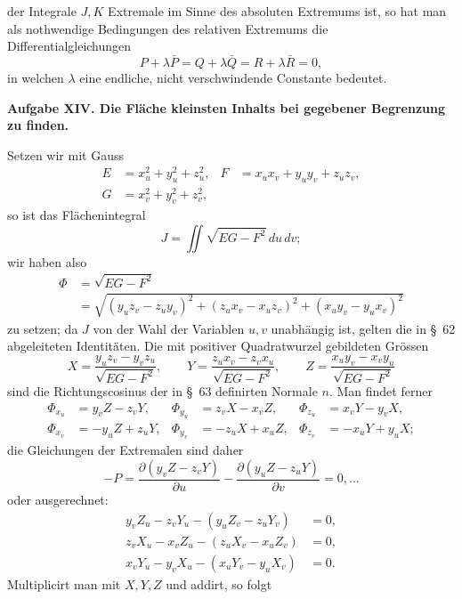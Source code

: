 \documentclass[11pt,a4paper,leqno]{article}
\begin{document}
der Integrale $J,K$ Extremale im Sinne des absoluten Extremums ist,
so hat man als nothwendige Bedingungen des relativen Extremums
die Differentialgleichungen
\[
P+\lambda\bar P=Q+\lambda\bar Q=R+\lambda\bar R=0,
\]
in welchen $\lambda$ eine endliche, nicht verschwindende Constante bedeutet.

\begin{center}
\textbf{Aufgabe XIV. Die Fläche kleinsten Inhalts bei gegebener
Begrenzung zu finden.}
\end{center}

Setzen wir mit Gauss
\[
\begin{aligned}
E&=x_u^2+y_u^2+z_u^2,
&F&=x_ux_v+y_uy_v+z_uz_v,\\
G&=x_v^2+y_v^2+z_v^2,
\end{aligned}
\]
so ist das Flächenintegral
\[
J=\iint\sqrt{EG-F^2}\,du\,dv;
\]
wir haben also
\[
\begin{aligned}
\Phi&=\sqrt{EG-F^2}\\
&=\sqrt{(y_uz_v-z_uy_v)^2+(z_ux_v-x_uz_v)^2+(x_uy_v-y_ux_v)^2}
\end{aligned}
\]
zu setzen; da $J$ von der Wahl der Variablen $u,v$ unabhängig
ist, gelten die in \S~62 abgeleiteten Identitäten. Die mit positiver
Quadratwurzel gebildeten Grössen
\[
X=\frac{y_uz_v-y_vz_u}{\sqrt{EG-F^2}},\qquad
Y=\frac{z_ux_v-z_vx_u}{\sqrt{EG-F^2}},\qquad
Z=\frac{x_uy_v-x_vy_u}{\sqrt{EG-F^2}}
\]
sind die Richtungscosinus der in \S~63 definirten Normale $n$.
Man findet ferner
\begin{equation}\tag{10}
\begin{aligned}
\Phi_{x_u}&=y_vZ-z_vY,&
\Phi_{y_u}&=z_vX-x_vZ,&
\Phi_{z_u}&=x_vY-y_vX,\\
\Phi_{x_v}&=-y_uZ+z_uY,&
\Phi_{y_v}&=-z_uX+x_uZ,&
\Phi_{z_v}&=-x_uY+y_uX;
\end{aligned}
\end{equation}
die Gleichungen der Extremalen sind daher
\[
-P=\frac{\partial(y_vZ-z_vY)}{\partial u}
-\frac{\partial(y_uZ-z_uY)}{\partial v}=0,\ldots
\]
oder ausgerechnet:
\[
\begin{aligned}
y_vZ_u-z_vY_u-(y_uZ_v-z_uY_v)&=0,\\
z_vX_u-x_vZ_u-(z_uX_v-x_uZ_v)&=0,\\
x_vY_u-y_vX_u-(x_uY_v-y_uX_v)&=0.
\end{aligned}
\]
Multiplicirt man mit $X,Y,Z$ und addirt, so folgt
\end{document}
